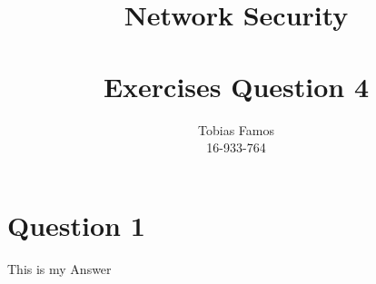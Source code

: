 \documentclass[11pt,a4paper]{article}
\title{Network Security \\ ~\\ \Large{Exercises Question 4}}
\author{Tobias Famos\\ 16-933-764}
\begin{document}
    \maketitle
    \section{Question 1}
    This is my Answer
\end{document}

